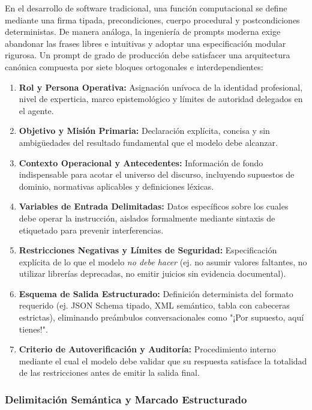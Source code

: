 En el desarrollo de software tradicional, una función computacional se define mediante una firma tipada, precondiciones, cuerpo procedural y postcondiciones deterministas. De manera análoga, la ingeniería de prompts moderna exige abandonar las frases libres e intuitivas y adoptar una especificación modular rigurosa. Un prompt de grado de producción debe satisfacer una arquitectura canónica compuesta por siete bloques ortogonales e interdependientes:

\begin{enumerate}
    \item \textbf{Rol y Persona Operativa:} Asignación unívoca de la identidad profesional, nivel de experticia, marco epistemológico y límites de autoridad delegados en el agente.
    \item \textbf{Objetivo y Misión Primaria:} Declaración explícita, concisa y sin ambigüedades del resultado fundamental que el modelo debe alcanzar.
    \item \textbf{Contexto Operacional y Antecedentes:} Información de fondo indispensable para acotar el universo del discurso, incluyendo supuestos de dominio, normativas aplicables y definiciones léxicas.
    \item \textbf{Variables de Entrada Delimitadas:} Datos específicos sobre los cuales debe operar la instrucción, aislados formalmente mediante sintaxis de etiquetado para prevenir interferencias.
    \item \textbf{Restricciones Negativas y Límites de Seguridad:} Especificación explícita de lo que el modelo \textit{no debe hacer} (ej. no asumir valores faltantes, no utilizar librerías deprecadas, no emitir juicios sin evidencia documental).
    \item \textbf{Esquema de Salida Estructurado:} Definición determinista del formato requerido (ej. JSON Schema tipado, XML semántico, tabla con cabeceras estrictas), eliminando preámbulos conversacionales como "¡Por supuesto, aquí tienes!".
    \item \textbf{Criterio de Autoverificación y Auditoría:} Procedimiento interno mediante el cual el modelo debe validar que su respuesta satisface la totalidad de las restricciones antes de emitir la salida final.
\end{enumerate}

\subsubsection{Delimitación Semántica y Marcado Estructurado}

